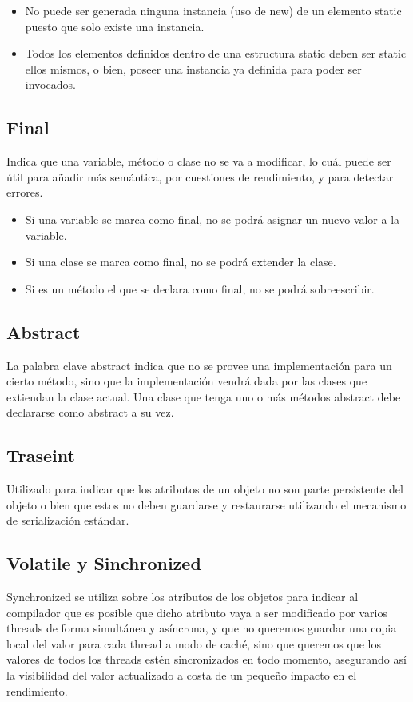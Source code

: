 \documentclass[12pt,letterpaper]{article}
\begin{document}
\begin{itemize}
\item No puede ser generada ninguna instancia (uso de new) de un elemento static puesto que solo existe una instancia.
\item Todos los elementos definidos dentro de una estructura static deben ser static ellos mismos, o bien, poseer una instancia ya definida para poder ser invocados.
\end{itemize}

\subsection*{Final}
Indica que una variable, método o clase no se va a modificar, lo cuál puede ser útil para añadir más semántica, por cuestiones de rendimiento, y para detectar errores.

\begin{itemize}
\item Si una variable se marca como final, no se podrá asignar un nuevo valor a la variable.
\item Si una clase se marca como final, no se podrá extender la clase.
\item Si es un método el que se declara como final, no se podrá sobreescribir.

\end{itemize}

\subsection*{Abstract}
La palabra clave abstract indica que no se provee una implementación para un cierto método, sino que la implementación vendrá dada por las clases que extiendan la clase actual. Una clase que tenga uno o más métodos abstract debe declararse como abstract a su vez.

\subsection*{Traseint}
Utilizado para indicar que los atributos de un objeto no son parte persistente del objeto o bien que estos no deben guardarse y restaurarse utilizando el mecanismo de serialización estándar.

\subsection*{Volatile y Sinchronized}
Synchronized se utiliza  sobre los atributos de los objetos para indicar al compilador que es posible que dicho atributo vaya a ser modificado por varios threads de forma simultánea y asíncrona, y que no queremos guardar una copia local del valor para cada thread a modo de caché, sino que queremos que los valores de todos los threads estén sincronizados en todo momento, asegurando así la visibilidad del valor actualizado a costa de un pequeño impacto en el rendimiento.
\end{document}
